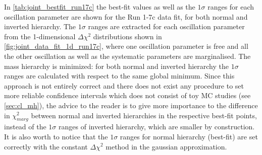 %
%
%





In \cref{tab:joint_bestfit_run17c} the best-fit values as well as the $1\sigma$ ranges for each 
oscillation parameter are shown for the Run 1-7c data fit, for both normal and inverted hierarchy.
The $1\sigma$ ranges are extracted for each oscillation parameter
from the 1-dimensional $\Delta \chi^2$ distributions shown in \cref{fig:joint_data_fit_1d_run17c},
where one oscillation parameter is free and all the other oscillation as well as the systematic 
parameters are marginalised.
The mass hierarchy is minimized:
for both normal and inverted hierarchy the $1\sigma$ ranges are calculated with respect to the 
same global minimum.
Since this approach is not entirely correct and there does not exist any procedure 
to set more reliable confidence intervals which does not consist of toy MC studies (see \cref{sec:cl_mh}),
the advice to the reader is to give more importance to the difference in $\chi^2_{marg}$
between normal and inverted hierarchies in the respective best-fit points, 
instead of the $1\sigma$ ranges of inverted hierarchy, 
which are smaller by construction.
It is also worth to notice that the $1\sigma$ ranges for normal hierarchy (best-fit)
are set correctly with the constant $\Delta \chi^2$ method in the gaussian approximation.

